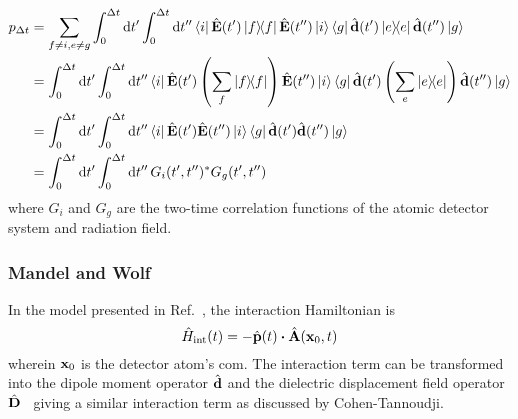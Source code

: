\begin{equation}
	\begin{split}
		p_{\Delta t}
		&=
		\sum_{f\neq i,e\neq g}
		\int_0^{\Delta t}\dd{t^\prime}
		\int_0^{\Delta t}\dd{t^{\prime\prime}}
		\bra{i}
		\hat{\vb{E}}(t^\prime)
		\ketbra{f}
		\hat{\vb{E}}(t^{\prime\prime})
		\ket{i}
		\bra{g}
		\hat{\vb{d}}(t^\prime)
		\ketbra{e}
		\hat{\vb{d}}(t^{\prime\prime})
		\ket{g}
		\\
		&=
		\int_0^{\Delta t}\dd{t^\prime}
		\int_0^{\Delta t}\dd{t^{\prime\prime}}
		\bra{i}
		\hat{\vb{E}}(t^\prime)
		\left(
			\sum_f
			\ketbra{f}
		\right)
		\hat{\vb{E}}(t^{\prime\prime})
		\ket{i}
		\bra{g}
		\hat{\vb{d}}(t^\prime)
		\left(
			\sum_e
			\ketbra{e}
		\right)
		\hat{\vb{d}}(t^{\prime\prime})
		\ket{g}
		\\
		&=
		\int_0^{\Delta t}\dd{t^\prime}
		\int_0^{\Delta t}\dd{t^{\prime\prime}}
		\bra{i}
		\hat{\vb{E}}(t^\prime)
		\hat{\vb{E}}(t^{\prime\prime})
		\ket{i}
		\bra{g}
		\hat{\vb{d}}(t^\prime)
		\hat{\vb{d}}(t^{\prime\prime})
		\ket{g}
		\\
		&=
		\int_0^{\Delta t}\dd{t^\prime}
		\int_0^{\Delta t}\dd{t^{\prime\prime}}
		G_i(t^\prime,t^{\prime\prime})^*
		G_g(t^\prime,t^{\prime\prime})
	\end{split}
\end{equation}
where $G_i$ and $G_g$ are the two-time correlation functions of the atomic detector system and radiation field.

\subsubsection{Mandel and Wolf}

In the model presented in Ref.~\cite[p.~685]{Mandel1995}, the interaction Hamiltonian is~\cite[p.~689]{Mandel1995}
\begin{equation}
	\hat{H}_\text{int}(t)
	=
	-
	\hat{\vb{p}}(t)
	\vdot
	\hat{\vb{A}}(\vb{x}_0,t)
\end{equation}
wherein $\vb{x}_0$ is the detector atom's \gls{com}.
The interaction term can be transformed into the dipole moment operator $\hat{\vb{d}}$ and the dielectric displacement field operator $\hat{\vb{D}}$~\cite[p.~689]{Mandel1995} giving a similar interaction term as discussed by Cohen-Tannoudji.

